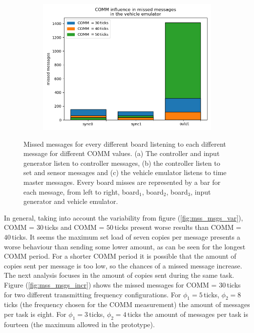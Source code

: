 \documentclass[table,xcdraw]{article}
\begin{document}
\begin{figure}[h!]
\begin{subfigure}[b]{0.4\textwidth}
         \includegraphics[width=\textwidth]{figures/missing_msgs/missed_msgs_COMM_vem.png}
         \caption{}
     \end{subfigure}
        \caption{Missed messages for every different board listening to each different message for different COMM values. (a) The controller and input generator listen to controller messages, (b) the controller listen to set and sensor messages and (c) the vehicle emulator listens to time master messages. Every board misses are represented by a bar for each message, from left to right, board$_1$, board$_2$, board$_3$, input generator and vehicle emulator.}
        \label{fig:mss_msgs_comm}
\end{figure}

In general, taking into account the variability from figure (\ref{fig:mss_msgs_var}), COMM = $30\,$ticks and COMM = $50\,$ticks present worse results than COMM = $40\,$ticks. It seems the maximum set load of seven copies per message presents a worse behaviour than sending some lower amount, as can be seen for the longest COMM period. For a shorter COMM period it is possible that the amount of copies sent per message is too low, so the chances of a missed message increase.\\

The next analysis focuses in the amount of copies sent during the same task. Figure (\ref{fig:mss_msgs_incr}) shows the missed messages for COMM = $30\,$ticks for two different transmitting frequency configurations. For $\phi_1 = 5\,$ticks, $\phi_2 = 8\,$ticks (the frequency chosen for the COMM measurement) the amount of messages per task is eight. For $\phi_1 = 3\,$ticks, $\phi_2 = 4\,$ticks the amount of messages per task is fourteen (the maximum allowed in the prototype).\\
\end{document}
